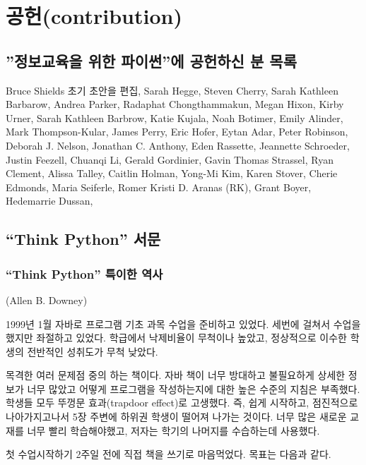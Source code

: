 
\chapter{공헌(contribution)}
\section*{''정보교육을 위한 파이썬''에 공헌하신 분 목록}

Bruce Shields 초기 초안을 편집,
Sarah Hegge,
Steven Cherry,
Sarah Kathleen Barbarow,
Andrea Parker,
Radaphat Chongthammakun,
Megan Hixon,
Kirby Urner,
Sarah Kathleen Barbrow,
Katie Kujala,
Noah Botimer,
Emily Alinder,
Mark Thompson-Kular,
James Perry,
Eric Hofer,
Eytan Adar,
Peter Robinson,
Deborah J. Nelson,
Jonathan C. Anthony,
Eden Rassette,
Jeannette Schroeder,
Justin Feezell,
Chuanqi Li,
Gerald Gordinier,
Gavin Thomas Strassel,
Ryan Clement,
Alissa Talley,
Caitlin Holman,
Yong-Mi Kim,
Karen Stover,
Cherie Edmonds,
Maria Seiferle,
Romer Kristi D. Aranas (RK),
Grant Boyer,
Hedemarrie Dussan,


\section*{``Think Python'' 서문}

\subsection*{``Think Python'' 특이한 역사}

(Allen B. Downey)

1999년 1월 자바로 프로그램 기초 과목 수업을 준비하고 있었다.
세번에 걸쳐서 수업을 했지만 좌절하고 있었다.
학급에서 낙제비율이 무척이나 높았고, 정상적으로 이수한 학생의 전반적인 성취도가 무척 낮았다.

목격한 여러 문제점 중의 하는 책이다.
자바 책이 너무 방대하고 불필요하게 상세한 정보가 너무 많았고 어떻게 프로그램을 작성하는지에 대한
높은 수준의 지침은 부족했다.
학생들 모두 뚜껑문 효과(trapdoor effect)로 고생했다. 즉, 쉽게 시작하고, 점진적으로 나아가지고나서 5장 주변에 
하위권 학생이 떨어져 나가는 것이다. 너무 많은 새로운 교재를 너무 빨리 학습해야했고,
저자는 학기의 나머지를 수습하는데 사용했다.

첫 수업시작하기 2주일 전에 직접 책을 쓰기로 마음먹었다.
목표는 다음과 같다.

